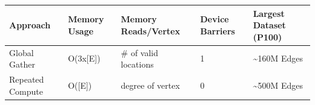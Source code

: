 \documentclass[10pt,oneside]{memoir}
\begin{document}
\begin{longtable}[]{@{}lllll@{}}
\toprule
\begin{minipage}[b]{0.16\columnwidth}\raggedright
Approach\strut
\end{minipage} & \begin{minipage}[b]{0.13\columnwidth}\raggedright
Memory Usage\strut
\end{minipage} & \begin{minipage}[b]{0.20\columnwidth}\raggedright
Memory Reads/Vertex\strut
\end{minipage} & \begin{minipage}[b]{0.15\columnwidth}\raggedright
Device Barriers\strut
\end{minipage} & \begin{minipage}[b]{0.22\columnwidth}\raggedright
Largest Dataset (P100)\strut
\end{minipage}\tabularnewline
\midrule
\endhead
\begin{minipage}[t]{0.16\columnwidth}\raggedright
Global Gather\strut
\end{minipage} & \begin{minipage}[t]{0.13\columnwidth}\raggedright
O(3x{[}E{]})\strut
\end{minipage} & \begin{minipage}[t]{0.20\columnwidth}\raggedright
\# of valid locations\strut
\end{minipage} & \begin{minipage}[t]{0.15\columnwidth}\raggedright
1\strut
\end{minipage} & \begin{minipage}[t]{0.22\columnwidth}\raggedright
\textasciitilde{}160M Edges\strut
\end{minipage}\tabularnewline
\begin{minipage}[t]{0.16\columnwidth}\raggedright
Repeated Compute\strut
\end{minipage} & \begin{minipage}[t]{0.13\columnwidth}\raggedright
O({[}E{]})\strut
\end{minipage} & \begin{minipage}[t]{0.20\columnwidth}\raggedright
degree of vertex\strut
\end{minipage} & \begin{minipage}[t]{0.15\columnwidth}\raggedright
0\strut
\end{minipage} & \begin{minipage}[t]{0.22\columnwidth}\raggedright
\textasciitilde{}500M Edges\strut
\end{minipage}\tabularnewline
\bottomrule
\end{longtable}
\end{document}
